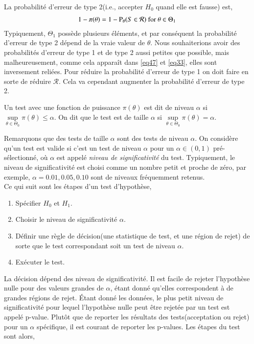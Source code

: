 \documentclass[10pt, reqno]{amsart}
\begin{document}
La probabilité d'erreur de type 2(i.e., accepter $H_0$ quand elle est fausse) est,
\begin{align}
1 -\pi(\theta) = 1 - \Prob_\theta(S\in\mathcal{R}) \ \textrm{for} \ \theta\in \Theta_1
\label{eq33}
\end{align}
Typiquement, $\Theta_1$ possède plusieurs éléments, et par conséquent la probabilité d'erreur de type 2 dépend de la vraie valeur de $\theta$. Nous souhaiterions avoir des probabilités d'erreur de type 1 et de type 2 aussi petites que possible, mais malheureusement, comme cela apparaît dans \eqref{eq47} et \eqref{eq33}, elles sont inversement reliées. Pour réduire la probabilité d'erreur de type 1 on doit faire en sorte de réduire $\mathcal{R}$. Cela va cependant augmenter la probabilité d'erreur de type 2.
\begin{definition}
Un test avec une fonction de puissance $\pi(\theta)$ est dit de niveau $\alpha$ si $\underset{\theta\in\Theta_0}{\sup} \pi(\theta) \leq \alpha$. On dit que le test est de taille $\alpha$ si $\underset{\theta\in\Theta_0}{\sup} \pi(\theta) = \alpha$.
\label{de1}
\end{definition} 
Remarquons que des tests de taille $\alpha$ sont des tests de niveau $\alpha$. On considère qu'un test est valide si c'est un test de niveau $\alpha$ pour un $\alpha\in (0,1)$ pré-sélectionné, où $\alpha$ est appelé \emph{niveau de significativité} du test. Typiquement, le niveau de significativité est choisi comme un nombre petit et proche de zéro, par exemple, $\alpha = 0.01, 0.05, 0.10$ sont de niveaux fréquemment  retenus.\\
Ce qui suit sont les étapes d'un test d'hypothèse,
\begin{enumerate}
\item Spécifier $H_0$ et $H_1$.
\item Choisir le niveau de significativité $\alpha$.
\item Définir une règle de décision(une statistique de test, et une région de rejet) de sorte que le test correspondant soit un test de niveau $\alpha$.
\item Exécuter le test.
\end{enumerate}
La décision dépend des niveau de significativité. Il est facile de rejeter l'hypothèse nulle pour des valeurs grandes de $\alpha$, étant donné qu'elles correspondent à de grandes régions de rejet. \'Etant donné les données, le plus petit niveau de significativité pour lequel l'hypothèse nulle peut être rejetée par un test est appelé p-value. Plutôt que de reporter les résultats des tests(acceptation ou rejet) pour un $\alpha$ spécifique, il est courant de reporter les p-values. Les étapes du test sont alors,
\end{document}
